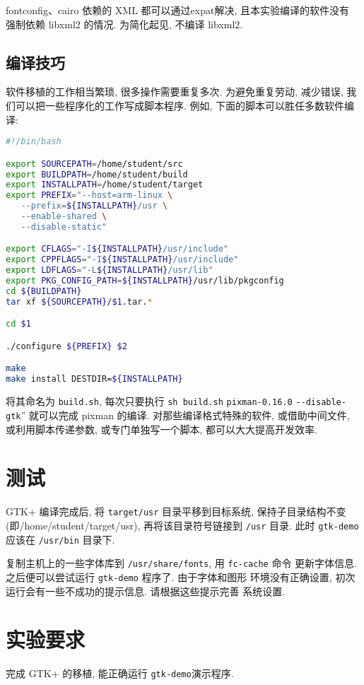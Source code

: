 fontconfig、cairo 依赖的 XML 都可以通过expat解决, 且本实验编译的软件没有
强制依赖 libxml2 的情况. 为简化起见, 不编译 libxml2.

\subsection{编译技巧}
    软件移植的工作相当繁琐, 很多操作需要重复多次. 为避免重复劳动, 减少错误,
我们可以把一些程序化的工作写成脚本程序. 例如, 下面的脚本可以胜任多数软件编译:

\begin{lstlisting}[language=bash, showspaces=false,columns=flexible]
#!/bin/bash

export SOURCEPATH=/home/student/src
export BUILDPATH=/home/student/build
export INSTALLPATH=/home/student/target
export PREFIX="--host=arm-linux \
   --prefix=${INSTALLPATH}/usr \
   --enable-shared \
   --disable-static"

export CFLAGS="-I${INSTALLPATH}/usr/include"
export CPPFLAGS="-I${INSTALLPATH}/usr/include"
export LDFLAGS="-L${INSTALLPATH}/usr/lib"
export PKG_CONFIG_PATH=${INSTALLPATH}/usr/lib/pkgconfig
cd ${BUILDPATH}
tar xf ${SOURCEPATH}/$1.tar.*

cd $1

./configure ${PREFIX} $2

make
make install DESTDIR=${INSTALLPATH}
\end{lstlisting}
将其命名为 \verb|build.sh|, 每次只要执行 \verb|sh build.sh|
\verb|pixman-0.16.0| \verb|--disable-gtk|''
就可以完成 pixman 的编译. 对那些编译格式特殊的软件, 或借助中间文件,
或利用脚本传递参数, 或专门单独写一个脚本, 都可以大大提高开发效率.

\section{测试}
GTK+ 编译完成后, 将 \verb|target/usr| 目录平移到目标系统, 保持子目录结构不变
(即/home/student/target/usr), 再将该目录符号链接到 \verb|/usr| 目录. 此时
\verb|gtk-demo| 应该在 \verb|/usr/bin| 目录下.

复制主机上的一些字体库到 \verb|/usr/share/fonts|, 用 \verb|fc-cache| 命令
更新字体信息. 之后便可以尝试运行 \verb|gtk-demo| 程序了. 由于字体和图形
环境没有正确设置, 初次运行会有一些不成功的提示信息. 请根据这些提示完善
系统设置.

\section{实验要求}
完成 GTK+ 的移植, 能正确运行 \verb|gtk-demo|演示程序.

